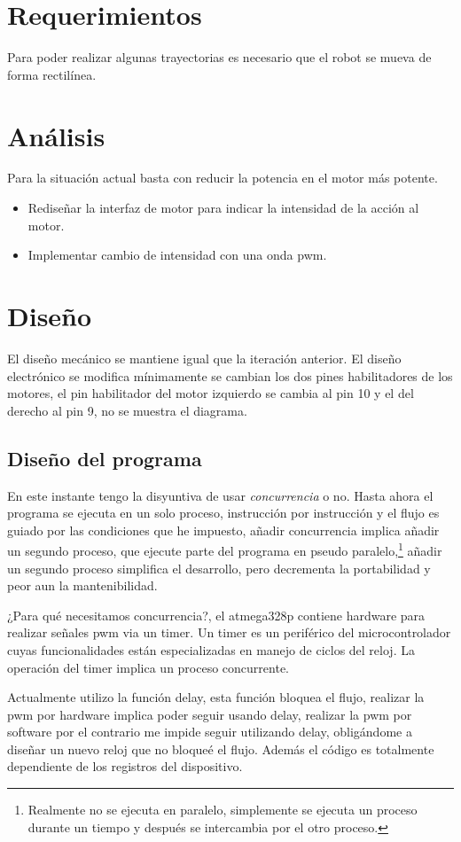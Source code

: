 \section{Requerimientos}
Para poder realizar algunas trayectorias es necesario que el robot se mueva de
forma rectilínea.
\section{Análisis}
Para la situación actual basta con reducir la potencia en el motor más potente.
\begin{itemize}
	\item Rediseñar la interfaz de motor para indicar la intensidad de la 
		acción al motor.
	\item Implementar cambio de intensidad con una onda pwm.
\end{itemize}

\section{Diseño}
El diseño mecánico se mantiene igual que la iteración anterior. El diseño
electrónico se modifica mínimamente se cambian los dos pines
habilitadores de los motores, el pin habilitador del motor izquierdo se cambia
al pin 10 y el del derecho al pin 9, no se muestra el diagrama.

\subsection{Diseño del programa}
En este instante tengo la disyuntiva de usar \emph{concurrencia} o no. Hasta 
ahora el programa se ejecuta en un solo proceso, instrucción por instrucción y 
el flujo es guiado por las condiciones que he impuesto, añadir concurrencia 
implica añadir un segundo proceso, que ejecute parte del programa en pseudo 
paralelo,\footnote{Realmente no se ejecuta en paralelo, simplemente se ejecuta
un proceso durante un tiempo y después se intercambia por el otro proceso.}
añadir un segundo proceso simplifica el desarrollo, pero decrementa la 
portabilidad y peor aun la mantenibilidad.

¿Para qué necesitamos concurrencia?, el atmega328p contiene hardware para 
realizar señales pwm via un timer. Un timer es un periférico del microcontrolador
cuyas funcionalidades están especializadas en manejo de ciclos del reloj.
La operación del timer implica un proceso concurrente. 

Actualmente utilizo la función delay, esta función bloquea el flujo, realizar la pwm
por hardware implica poder seguir usando delay, realizar la pwm por software por el 
contrario me impide seguir utilizando delay, obligándome a diseñar un nuevo 
reloj que no bloqueé el flujo. Además el código es totalmente dependiente de los
registros del dispositivo.

